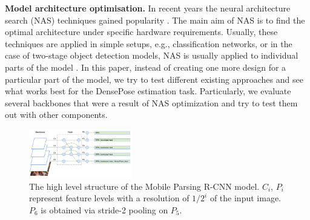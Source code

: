 \noindent \textbf{Model architecture optimisation.}
In recent years the neural architecture search (NAS) techniques gained popularity \cite{automl}. The main aim of NAS is to find the optimal architecture under specific hardware requirements. Usually, these techniques are applied in simple setups, e.g., classification networks, or in the case of two-stage object detection models, NAS is usually applied to individual parts of the model \cite{nasfpn}. In this paper, instead of creating one more design for a particular part of the model, we try to test different existing approaches and see what works best for the DensePose estimation task. Particularly, we evaluate several backbones that were a result of NAS optimization and try to test them out with other components.

\begin{figure}[!hbtp]
\centering
\includegraphics[width=0.4\textwidth]{Figures/densepose/scheme.pdf}
\caption{The high level structure of the Mobile Parsing R-CNN model. $C_i$, $P_i$ represent feature levels with a resolution of $1/2^i$ of the input image. $P_6$ is obtained via stride-2 pooling on $P_5$.}
\label{fig:scheme}
\end{figure}